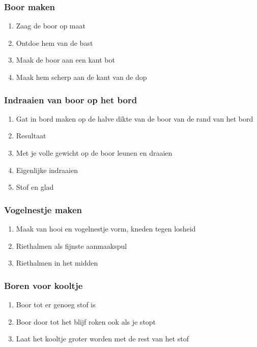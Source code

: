 \documentclass[a4paper, handout]{beamer}
\begin{document}
\begin{frame}
	\frametitle{Boor maken}
	\begin{enumerate}
		\item{Zaag de boor op maat}
		\item{Ontdoe hem van de bast}
		\item{Maak de boor aan een kant bot}
		\item{Maak hem scherp aan de kant van de dop}
	\end{enumerate}
\end{frame}

\begin{frame}
	\frametitle{Indraaien van boor op het bord}
	\begin{enumerate}
		\item{Gat in bord maken op de halve dikte van de boor van de rand van het bord}
		\item{Resultaat}
		\item{Met je volle gewicht op de boor leunen en draaien}
		\item{Eigenlijke indraaien}
		\item{Stof en glad}
	\end{enumerate}
\end{frame}

\begin{frame}
	\frametitle{Vogelnestje maken}
	\begin{enumerate}
		\item{Maak van hooi en vogelnestje vorm, kneden tegen losheid}
		\item{Riethalmen als fijnste aanmaakspul}
		\item{Riethalmen in het midden}
	\end{enumerate}
\end{frame}

\begin{frame}
	\frametitle{Boren voor kooltje}
	\begin{enumerate}
		\item{Boor tot er genoeg stof is}
		\item{Boor door tot het blijf roken ook als je stopt}
		\item{Laat het kooltje groter worden met de rest van het stof}
	\end{enumerate}
\end{frame}
\end{document}

